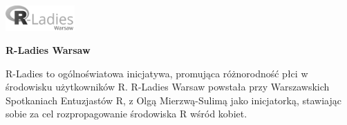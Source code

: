 \documentclass[\main/boa.tex]{subfiles}
\begin{document}
	
	\begin{minipage}[t]{0.915\textwidth}
		\center     
		\includegraphics[width=100px]{img/logos.bw/R-Ladies.png} 
	\end{minipage}
	\begin{center}
	\Large \textbf {R-Ladies Warsaw}
	\end{center}
	
	\vskip 0.3cm
	\normalsize 
	R-Ladies to ogólnoświatowa inicjatywa, promująca różnorodność płci w środowisku użytkowników R. R-Ladies Warsaw powstała przy Warszawskich Spotkaniach Entuzjastów R, z Olgą Mierzwą-Sulimą jako inicjatorką, stawiając sobie za cel rozpropagowanie środowiska R wśród kobiet.
	
	\vskip 1.5cm
\end{document}
